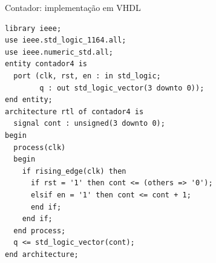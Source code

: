 \begin{frame}[fragile,t]{Contador: implementação em VHDL}
\begin{lstlisting}[basicstyle=\ttfamily\fontsize{7}{8}\selectfont]
library ieee;
use ieee.std_logic_1164.all;
use ieee.numeric_std.all;
entity contador4 is
  port (clk, rst, en : in std_logic;
        q : out std_logic_vector(3 downto 0));
end entity;
architecture rtl of contador4 is
  signal cont : unsigned(3 downto 0);
begin
  process(clk)
  begin
    if rising_edge(clk) then
      if rst = '1' then cont <= (others => '0');
      elsif en = '1' then cont <= cont + 1;
      end if;
    end if;
  end process;
  q <= std_logic_vector(cont);
end architecture;
\end{lstlisting}
\end{frame}
